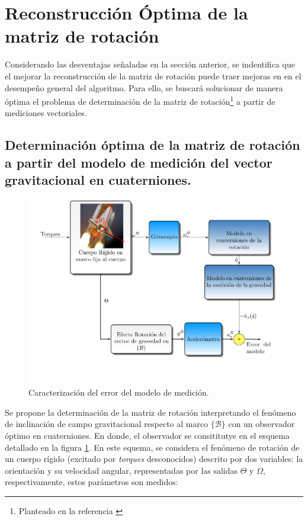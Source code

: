 \documentclass[conference]{IEEEtran}
\newcommand{\marco}[1]{\{\mathcal{#1}\}}
\begin{document}
\section{Reconstrucción Óptima de la matriz de rotación}
Considerando las desventajas señaladas en la sección anterior, se indentifica que el mejorar la reconstrucción de la matriz de rotación puede traer mejoras en en el desempeño general del algoritmo. Para ello, se buscará solucionar de manera óptima el problema de determinación de la matriz de rotación\footnote{Planteado en la referencia \cite{Mahony2008}} a partir de mediciones vectoriales.
\subsection{Determinación óptima de la matriz de rotación a partir del modelo de medición del vector gravitacional en cuaterniones.}
\begin{figure} [t]
\begin{center}
\includegraphics[scale=0.50,viewport=20 50 430 330,clip]{ObsOptimo_fig3.pdf}
\caption{Caracterización del error del modelo de medición.}
\label{ObsOptimo_fig2}
\end{center}
\end{figure}
Se propone la determinación de la matriz de rotación interpretando el fenómeno de inclinación de campo gravitacional respecto al marco $\marco{B}$ con un observador óptimo en cuaterniones. En donde, el observador se consititutye en el esquema detallado en la figura \ref{ObsOptimo_fig2}. En este equema, se considera el fenómeno de rotación de un cuerpo rígido (excitado por \emph{torques} desconocidos) descrito por dos variables: la orientación y su velocidad angular, representadas por las salidas $\Theta$ y $\Omega$, respectivamente, estos parámetros son medidos:
\end{document}
